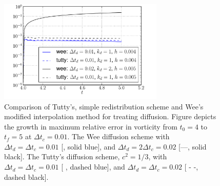 	\begin{figure}[!t]
	\centering
	\includegraphics[width=0.7\textwidth]{figures/lagrangian/lambOseen_diffusionMethod_comparison_compressed.pdf}
	\caption{Comparison of Tutty's, simple redistribution scheme and Wee's modified interpolation method for treating diffusion. Figure depicts the growth in maximum relative error in vorticity from $t_0=4$ to $t_f=5$ at $\Delta t_c = 0.01$. The Wee diffusion scheme with $\Delta t_d = \Delta t_c = 0.01$ [{\color{plotBlue}{---}}, solid blue], and $\Delta t_d = 2 \Delta t_c = 0.02$ [---, solid black]. The Tutty's diffusion scheme, $c^2 = 1/3$, with $\Delta t_d = \Delta t_c = 0.01$ [ {\color{plotBlue}{- -}}, dashed blue], and $\Delta t_d = \Delta t_c = 0.02$ [ - -, dashed black].}
	\label{fig:lambOseen_diffusionMethod_comparison_compressed}
	\end{figure}

